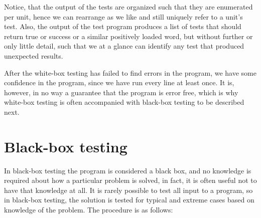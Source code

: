 Notice, that the output of the tests are organized such that they are enumerated per unit, hence we can rearrange as we like and still uniquely refer to a unit's test. Also, the output of the test program produces a list of tests that should return true or success or a similar positively loaded word, but without further or only little detail, such that we at a glance can identify any test that produced unexpected results.

After the white-box testing has failed to find errors in the program, we have some confidence in the program, since we have run every line at least once. It is, however, in no way a guarantee that the program is error free, which is why white-box testing is often accompanied with black-box testing to be described next.

\section{Black-box testing}
In black-box testing the program is considered a black box, and no knowledge is required about how a particular problem is solved, in fact, it is often useful not to have that knowledge at all. It is rarely possible to test all input to a program, so in black-box testing, the solution is tested for typical and extreme cases based on knowledge of the problem. The procedure is as follows:
